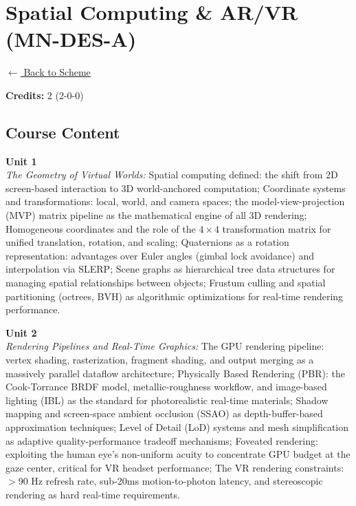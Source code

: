\section*{Spatial Computing \& AR/VR (MN-DES-A)}
\label{minor:DES_L2}

\noindent \small{\hyperref[main:scheme]{$\leftarrow$ Back to Scheme}} \vspace{0.5cm}

\noindent \textbf{Credits:} 2 (2-0-0)

\subsection*{Course Content}
\noindent\textbf{Unit 1} \\
\textit{The Geometry of Virtual Worlds:} Spatial computing defined: the shift from 2D screen-based interaction to 3D world-anchored computation; Coordinate systems and transformations: local, world, and camera spaces; the model-view-projection (MVP) matrix pipeline as the mathematical engine of all 3D rendering; Homogeneous coordinates and the role of the $4 \times 4$ transformation matrix for unified translation, rotation, and scaling; Quaternions as a rotation representation: advantages over Euler angles (gimbal lock avoidance) and interpolation via SLERP; Scene graphs as hierarchical tree data structures for managing spatial relationships between objects; Frustum culling and spatial partitioning (octrees, BVH) as algorithmic optimizations for real-time rendering performance.

\vspace{0.3cm}

\noindent\textbf{Unit 2} \\
\textit{Rendering Pipelines and Real-Time Graphics:} The GPU rendering pipeline: vertex shading, rasterization, fragment shading, and output merging as a massively parallel dataflow architecture; Physically Based Rendering (PBR): the Cook-Torrance BRDF model, metallic-roughness workflow, and image-based lighting (IBL) as the standard for photorealistic real-time materials; Shadow mapping and screen-space ambient occlusion (SSAO) as depth-buffer-based approximation techniques; Level of Detail (LoD) systems and mesh simplification as adaptive quality-performance tradeoff mechanisms; Foveated rendering: exploiting the human eye's non-uniform acuity to concentrate GPU budget at the gaze center, critical for VR headset performance; The VR rendering constraints: $>$90 Hz refresh rate, sub-20ms motion-to-photon latency, and stereoscopic rendering as hard real-time requirements.


